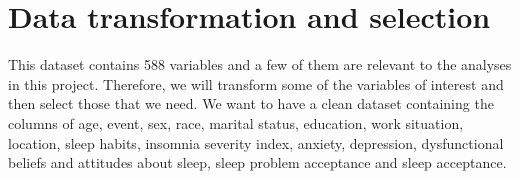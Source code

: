 \documentclass[
  letterpaper,
  DIV=11,
  numbers=noendperiod]{scrreprt}
\begin{document}
\hypertarget{data-transformation-and-selection}{%
\section{Data transformation and
selection}\label{data-transformation-and-selection}}

This dataset contains 588 variables and a few of them are relevant to
the analyses in this project. Therefore, we will transform some of the
variables of interest and then select those that we need. We want to
have a clean dataset containing the columns of age, event, sex, race,
marital status, education, work situation, location, sleep habits,
insomnia severity index, anxiety, depression, dysfunctional beliefs and
attitudes about sleep, sleep problem acceptance and sleep acceptance.
\end{document}
